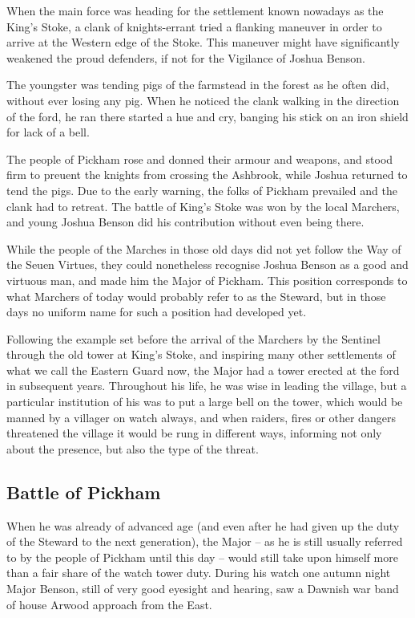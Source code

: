 When the main force
was heading for the settlement
known nowadays as the King’s
Stoke, a clank of knights-errant
tried a flanking maneuver in order
to arrive at the Western edge of the
Stoke. This maneuver might have
significantly weakened the proud
defenders, if not for the Vigilance of
Joshua Benson.

The youngster was
tending pigs of the farmstead in the
forest as he
often did,
without
ever losing
any pig.
When he
noticed the clank
walking in the direction of the ford,
he ran there started a hue and cry,
banging his stick on an iron shield
for lack of a bell.

The people of
Pickham rose and donned their
armour and weapons, and stood
firm to preuent the knights from
crossing the Ashbrook, while Joshua
returned to tend the pigs. Due to the
early warning, the folks of
Pickham prevailed and the clank had
to retreat. The battle of King’s
Stoke was won by the local
Marchers, and young Joshua Benson
did his contribution without even
being there.

While the people
of the Marches in those old days did
not yet follow the Way of the Seuen
Virtues, they could nonetheless
recognise Joshua Benson as a good
and virtuous man, and made him
the Major of Pickham. This position
corresponds to what Marchers of
today would probably refer to as the
Steward, but in those days no
uniform name for such a position had
developed yet.

Following the example
set before the arrival of the Marchers
by the Sentinel through the old tower at King's Stoke, and
inspiring many other settlements of
what we call the Eastern Guard
now, the Major had a tower erected
at the ford in subsequent years.
Throughout his life, he was wise
in leading the village, but a
particular institution of his was to
put a large bell on the tower, which
would be manned by a villager on
watch always, and when raiders,
fires or other dangers threatened the
village it would be rung in
different ways, informing not only
about the presence, but also the type
of the threat.

\subsection{Battle of Pickham}
When he was already of
advanced age (and even
after he had given up the
duty of the Steward to the next generation), the
Major – as he is still usually referred
to by the people of Pickham until
this day – would still take upon
himself more than a fair share of the
watch tower duty. During his
watch one autumn night Major
Benson, still of very good eyesight
and hearing, saw a Dawnish war
band of house Arwood approach
from the East.

